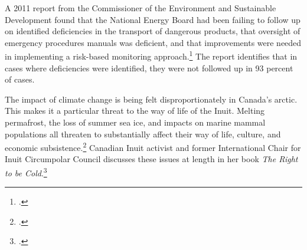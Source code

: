 A 2011 report from the Commissioner of the Environment and Sustainable Development found that the National Energy Board had been failing to follow up on identified deficiencies in the transport of dangerous products, that oversight of emergency procedures manuals was deficient, and that improvements were needed in implementing a risk-based monitoring approach.\footcite[][p. 21, 24, 26]{CESD2011Dec}
The report identifies that in cases where deficiencies were identified, they were not followed up in 93 percent of cases.



The impact of climate change is being felt disproportionately in Canada's arctic.
This makes it a particular threat to the way of life of the Inuit.
Melting permafrost, the loss of summer sea ice, and impacts on marine mammal populations all threaten to substantially affect their way of life, culture, and economic subsistence.\footcite[See: ][]{Ahmed2013}
Canadian Inuit activist and former International Chair for Inuit Circumpolar Council discusses these issues at length in her book \emph{The Right to be Cold}.\footcite[][]{RightToBeCold}



